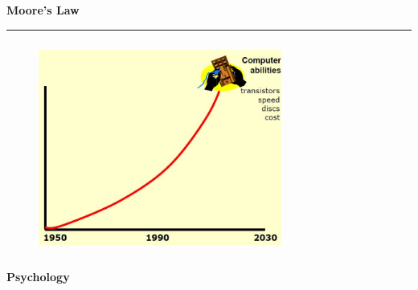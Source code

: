\documentclass[pdf]{beamer}
\begin{document}
{{\begin{frame}
\end{frame}}



{
\begin{frame}
\vspace{8mm}
\textcolor{myBlue}{\textbf{\Large{Moore's Law}}}

\textcolor{red}{\rule{10cm}{1mm}}

\begin{figure}
\includegraphics[width=80mm, height=70mm, center]{4_moores_law.JPG} \par
\end{figure}

\begin{flushright}
\fontsize{0.5pt}{1pt}\selectfont{ \textcolor{lightgray}
{Saul Greenberg}}
\end{flushright}

\end{frame}



{
\begin{frame}
\vspace{8mm}
\textcolor{myBlue}{\textbf{\Large{Psychology}}}


\end{frame}}}}
\end{document}

